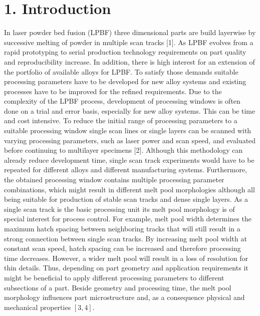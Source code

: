 \documentclass[10pt]{article}
\begin{document}
\section*{1. Introduction}
In laser powder bed fusion (LPBF) three dimensional parts are build layerwise by successive melting of powder in multiple scan tracks [1]. As LPBF evolves from a rapid prototyping to serial production technology requirements on part quality and reproducibility increase. In addition, there is high interest for an extension of the portfolio of available alloys for LPBF. To satisfy those demands suitable processing parameters have to be developed for new alloy systems and existing processes have to be improved for the refined requirements. Due to the complexity of the LPBF process, development of processing windows is often done on a trial and error basis, especially for new alloy systems. This can be time and cost intensive. To reduce the initial range of processing parameters to a suitable processing window single scan lines or single layers can be scanned with varying processing parameters, such as laser power and scan speed, and evaluated before continuing to multilayer specimens [2]. Although this methodology can already reduce development time, single scan track experiments would have to be repeated for different alloys and different manufacturing systems. Furthermore, the obtained processing window contains multiple processing parameter combinations, which might result in different melt pool morphologies although all being suitable for production of stable scan tracks and dense single layers. As a single scan track is the basic processing unit its melt pool morphology is of special interest for process control. For example, melt pool width determines the maximum hatch spacing between neighboring tracks that will still result in a strong connection between single scan tracks. By increasing melt pool width at constant scan speed, hatch spacing can be increased and therefore processing time decreases. However, a wider melt pool will result in a loss of resolution for thin details. Thus, depending on part geometry and application requirements it might be beneficial to apply different processing parameters to different subsections of a part. Beside geometry and processing time, the melt pool morphology influences part microstructure and, as a consequence physical and mechanical properties $[3,4]$.
\end{document}
